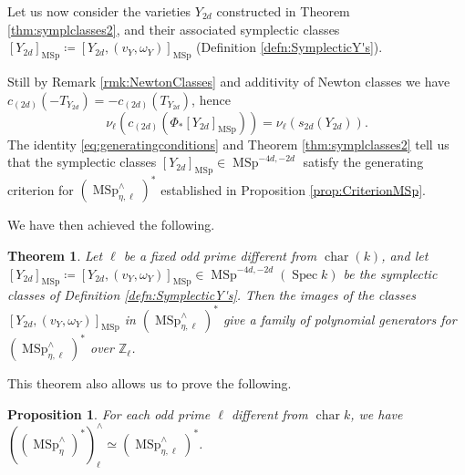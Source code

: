 \documentclass[10pt]{amsart}
\theoremstyle{definition}
\theoremstyle{plain}
\newtheorem{thm}[defn]{Theorem}
\newtheorem{prop}[defn]{Proposition}
\numberwithin{equation}{section}
\newcommand{\0}{\emptyset}
\newcommand{\Z}{{\mathbb Z}}
\newcommand{\MSp}{{\operatorname{MSp}}}
\newcommand{\Spec}{{\operatorname{Spec}}}
\newcommand{\chr}{{\operatorname{char}}}
\begin{document}
Let us now consider the varieties $Y_{2d}$ constructed in Theorem \ref{thm:symplclasses2}, and their associated symplectic classes $[Y_{2d}]_\MSp \coloneqq [Y_{2d},(v_Y,\omega_Y)]_\MSp$ (Definition \ref{defn:SymplecticY's}).

Still by Remark \ref{rmk:NewtonClasses} and additivity of Newton classes we have $c_{(2d)}(-T_{Y_{2d}})=-c_{(2d)}(T_{Y_{2d}})$, hence 
\begin{equation}
\label{eq:generatingconditions}
   \nu_\ell(c_{(2d)}(\Phi_*[Y_{2d}]_\MSp))=\nu_\ell(s_{2d}(Y_{2d})). 
\end{equation}
The identity \eqref{eq:generatingconditions} and Theorem \ref{thm:symplclasses2} tell us that the symplectic classes $[Y_{2d}]_\MSp \in \MSp^{-4d,-2d}$ satisfy the generating criterion for $(\MSp^\wedge_{\eta,\ell})^*$ established in Proposition \ref{prop:CriterionMSp}.

We have then achieved the following.

\begin{thm}
\label{thm:ClassOfGenerators}
    Let $\ell$ be a fixed odd prime different from $\chr(k)$, and let $[Y_{2d}]_\MSp \coloneqq [Y_{2d},(v_Y,\omega_Y)]_\MSp \in \MSp^{-4d,-2d}(\Spec k)$ be the symplectic classes of Definition \ref{defn:SymplecticY's}. Then the images of the classes $[Y_{2d},(v_Y,\omega_Y)]_\MSp$ in $(\MSp_{\eta,\ell}^\wedge)^*$ give a family of polynomial generators for $(\MSp_{\eta,\ell}^\wedge)^*$ over $\Z_\ell$.
\end{thm}

This theorem also allows us to prove the following.

\begin{prop}
\label{prop:eta-ellCompl}
    For each odd prime $\ell$ different from $\chr k$, we have $((\MSp^\wedge_\eta)^*)^\wedge_\ell \simeq (\MSp_{\eta,\ell}^\wedge)^*$.
\end{prop}
\end{document}
